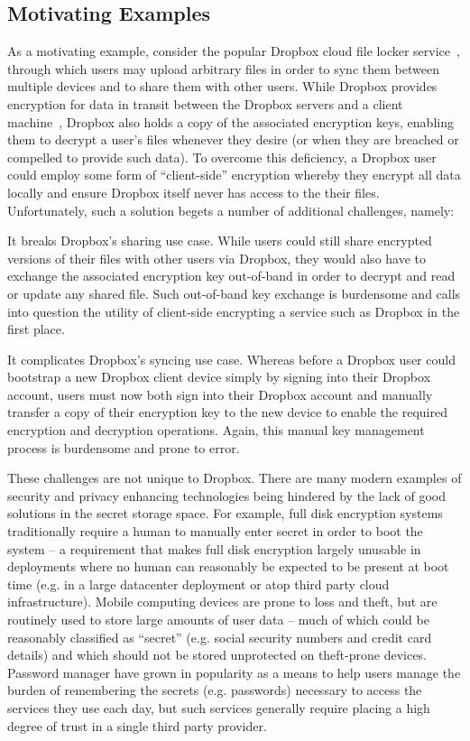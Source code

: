 \subsection{Motivating Examples}

As a motivating example, consider the popular Dropbox cloud file
locker service~\cite{dropbox}, through which users may upload
arbitrary files in order to sync them between multiple devices and to
share them with other users. While Dropbox provides encryption for
data in transit between the Dropbox servers and a client
machine~\cite{dropbox-security}, Dropbox also holds a copy of the
associated encryption keys, enabling them to decrypt a user's files
whenever they desire (or when they are breached or compelled to
provide such data)\cite{sayler-trust}. To overcome this deficiency, a
Dropbox user could employ some form of ``client-side'' encryption
whereby they encrypt all data locally and ensure Dropbox itself never
has access to the their files. Unfortunately, such a solution begets a
number of additional challenges, namely:

\begin{packed_enum}
\item It breaks Dropbox's sharing use case. While users could still
  share encrypted versions of their files with other users via
  Dropbox, they would also have to exchange the associated encryption
  key out-of-band in order to decrypt and read or update any shared
  file. Such out-of-band key exchange is burdensome and calls into
  question the utility of client-side encrypting a service such as
  Dropbox in the first place.
\item It complicates Dropbox's syncing use case. Whereas before a
  Dropbox user could bootstrap a new Dropbox client device simply by
  signing into their Dropbox account, users must now both sign into
  their Dropbox account and manually transfer a copy of their
  encryption key to the new device to enable the required encryption
  and decryption operations. Again, this manual key management process
  is burdensome and prone to error.
\end{packed_enum}

These challenges are not unique to Dropbox. There are many modern
examples of security and privacy enhancing technologies being hindered
by the lack of good solutions in the secret storage space. For
example, full disk encryption systems traditionally require a human to
manually enter secret in order to boot the system -- a requirement
that makes full disk encryption largely unusable in deployments where
no human can reasonably be expected to be present at boot time
(e.g. in a large datacenter deployment or atop third party cloud
infrastructure). Mobile computing devices are prone to loss and theft,
but are routinely used to store large amounts of user data -- much of
which could be reasonably classified as ``secret'' (e.g. social
security numbers and credit card details) and which should not be
stored unprotected on theft-prone devices. Password manager have grown
in popularity as a means to help users manage the burden of
remembering the secrets (e.g. passwords) necessary to access the
services they use each day, but such services generally require
placing a high degree of trust in a single third party provider.

